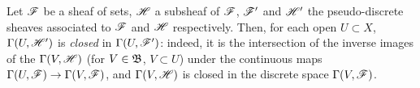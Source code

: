 \begin{env}[3.8.3]
\label{0.3.8.3}
Let $\mathscr{F}$ be a sheaf of sets, $\mathscr{H}$ a subsheaf of $\mathscr{F}$, $\mathscr{F}'$ and
$\mathscr{H}'$ the pseudo-discrete sheaves associated to $\mathscr{F}$ and $\mathscr{H}$
respectively. Then, for each open $U\subset X$, $\Gamma(U,\mathscr{H}')$ is
\emph{closed} in $\Gamma(U,\mathscr{F}')$: indeed, it is the intersection of the
inverse images of the $\Gamma(V,\mathscr{H})$ (for $V\in\mathfrak{B}$, $V\subset U$)
under the continuous maps $\Gamma(U,\sh{F})\to\Gamma(V,\sh{F})$, and
$\Gamma(V,\mathscr{H})$ is closed in the discrete space $\Gamma(V,\mathscr{F})$.
\end{env}
